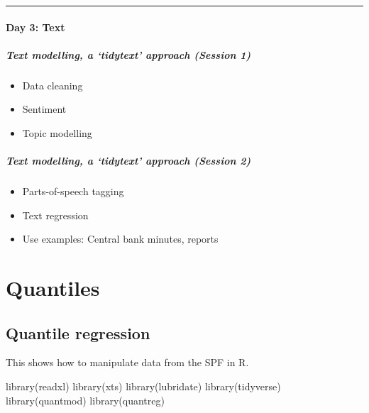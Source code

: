 \documentclass[
  letterpaper,
]{book}
\newenvironment{Shaded}{\begin{snugshade}}{\end{snugshade}}
\newcommand{\FunctionTok}[1]{\textcolor[rgb]{0.28,0.35,0.67}{#1}}
\newcommand{\NormalTok}[1]{\textcolor[rgb]{0.00,0.23,0.31}{#1}}
\providecommand{\tightlist}{%
  \setlength{\itemsep}{0pt}\setlength{\parskip}{0pt}}\usepackage{longtable,booktabs,array}
\begin{document}
\begin{center}\rule{0.5\linewidth}{0.5pt}\end{center}

\hypertarget{day-3-text}{%
\subsection{Day 3: Text}\label{day-3-text}}

\hypertarget{text-modelling-a-tidytext-approach-session-1}{%
\subsubsection{Text modelling, a `tidytext' approach (Session
1)}\label{text-modelling-a-tidytext-approach-session-1}}

\begin{itemize}
\tightlist
\item
  Data cleaning
\item
  Sentiment
\item
  Topic modelling
\end{itemize}

\hypertarget{text-modelling-a-tidytext-approach-session-2}{%
\subsubsection{Text modelling, a `tidytext' approach (Session
2)}\label{text-modelling-a-tidytext-approach-session-2}}

\begin{itemize}
\tightlist
\item
  Parts-of-speech tagging
\item
  Text regression
\item
  Use examples: Central bank minutes, reports
\end{itemize}

\part{Quantiles}

\hypertarget{quantile-regression}{%
\chapter{Quantile regression}\label{quantile-regression}}

This shows how to manipulate data from the SPF in R.

\begin{Shaded}
\begin{Highlighting}[]
\FunctionTok{library}\NormalTok{(readxl)}
\FunctionTok{library}\NormalTok{(xts)}
\FunctionTok{library}\NormalTok{(lubridate)}
\FunctionTok{library}\NormalTok{(tidyverse)}
\FunctionTok{library}\NormalTok{(quantmod)}
\FunctionTok{library}\NormalTok{(quantreg)}
\end{Highlighting}
\end{Shaded}
\end{document}
